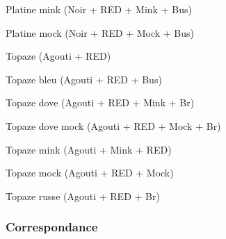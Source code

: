 \documentclass[a4paper,10pt]{article}
\begin{document}
Platine mink (Noir + RED + Mink + Bus)
 
Platine mock (Noir + RED + Mock + Bus)
 
Topaze (Agouti + RED)
 
Topaze bleu (Agouti + RED + Bus)
 
Topaze dove (Agouti + RED + Mink + Br)
 
Topaze dove mock (Agouti + RED + Mock + Br)
 
Topaze mink (Agouti + Mink + RED)
 
Topaze mock (Agouti + RED + Mock)
 
Topaze russe (Agouti + RED + Br)

\subsubsection{Correspondance}
\end{document}
